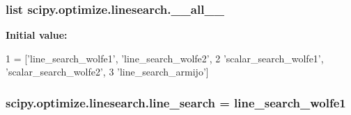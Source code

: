 \subsubsection[{\+\_\+\+\_\+all\+\_\+\+\_\+}]{\setlength{\rightskip}{0pt plus 5cm}list scipy.\+optimize.\+linesearch.\+\_\+\+\_\+all\+\_\+\+\_\+}\label{namespacescipy_1_1optimize_1_1linesearch_a43abb0559c075e1f3f528db85543d76d}
{\bfseries Initial value\+:}
\begin{DoxyCode}
1 = [\textcolor{stringliteral}{'line\_search\_wolfe1'}, \textcolor{stringliteral}{'line\_search\_wolfe2'},
2            \textcolor{stringliteral}{'scalar\_search\_wolfe1'}, \textcolor{stringliteral}{'scalar\_search\_wolfe2'},
3            \textcolor{stringliteral}{'line\_search\_armijo'}]
\end{DoxyCode}
\hypertarget{namespacescipy_1_1optimize_1_1linesearch_abdaf0387f19bd1267f58bff82abafb88}{}
\subsubsection[{line\+\_\+search}]{\setlength{\rightskip}{0pt plus 5cm}scipy.\+optimize.\+linesearch.\+line\+\_\+search = {\bf line\+\_\+search\+\_\+wolfe1}}\label{namespacescipy_1_1optimize_1_1linesearch_abdaf0387f19bd1267f58bff82abafb88}
